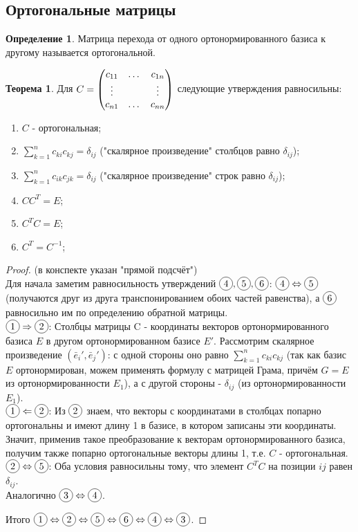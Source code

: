 \documentclass[a4paper, 12pt]{article}
\newcommand*\circled[1]{\tikz[baseline=(char.base)]{
            \node[shape=circle,draw,inner sep=2pt] (char) {#1};}}
\theoremstyle{definition}
\newtheorem*{definition}{Определение}
\newtheorem*{theorem}{Теорема}
\begin{document}
	\subsection{Ортогональные матрицы}
	\begin{definition}
		Матрица перехода от одного ортонормированного базиса к другому называется ортогональной.
	\end{definition}
	\begin{theorem}
		Для $C = \begin{pmatrix} c_{11}&\dots&c_{1n} \\ \vdots&\null&\vdots \\ c_{n1}&\dots&c_{nn} \end{pmatrix}$ следующие утверждения равносильны:
		\begin{enumerate}
			\item $C$ - ортогональная;
			\item $\sum \limits_{k=1}^{n} c_{ki}c_{kj} = \delta_{ij}$ ("скалярное произведение" столбцов равно $\delta_{ij}$);
			\item $\sum \limits_{k=1}^{n} c_{ik}c_{jk} = \delta_{ij}$ ("скалярное произведение" строк равно $\delta_{ij}$);
			\item $C C^T = E$;
			\item $C^T C = E$;
			\item $C^T = C^{-1}$;
		\end{enumerate}
	\end{theorem}
	\begin{proof}(в конспекте указан "прямой подсчёт")\\
		Для начала заметим равносильность утверждений $\circled{4}, \circled{5}, \circled{6}$: $\circled{4} \Leftrightarrow \circled{5}$ (получаются друг из друга транспонированием обоих частей равенства), а $\circled{6}$ равносильно им по определению обратной матрицы.\\
		$\circled{1} \Rightarrow \circled{2}$: Столбцы матрицы C - координаты векторов ортонормированного базиса $E$ в другом ортонормированном базисе $E'$. Рассмотрим скалярное произведение $(\bar{e}_{i}', \bar{e}_{j}')$: с одной стороны оно равно $\sum \limits_{k=1}^{n} c_{ki}c_{kj}$ (так как базис $E$ ортонормирован, можем применять формулу с матрицей Грама, причём $G = E$ из ортонормированности $E_{1}$), а с другой стороны - $\delta_{ij}$ (из ортонормированности $E_{1}$).\\
		$\circled{1} \Leftarrow \circled{2}$: Из $\circled{2}$ знаем, что векторы с координатами в столбцах попарно ортогональны и имеют длину 1 в базисе, в котором записаны эти координаты. Значит, применив такое преобразование к векторам ортонормированного базиса, получим также попарно ортогональные векторы длины 1, т.е. $C$ - ортогональная.\\
		$\circled{2} \Leftrightarrow \circled{5}$: Оба условия равносильны тому, что элемент $C^T C$ на позиции $ij$ равен $\delta_{ij}$.\\
		Аналогично $\circled{3} \Leftrightarrow \circled{4}$.

		Итого $\circled{1} \Leftrightarrow \circled{2} \Leftrightarrow \circled{5} \Leftrightarrow \circled{6} \Leftrightarrow \circled{4} \Leftrightarrow \circled{3}$.
	\end{proof}
\end{document}
